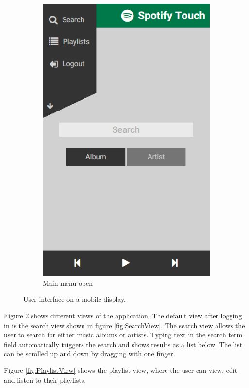 \documentclass[conference]{IEEEtran}
\begin{document}
\begin{figure}[htbp]
\begin{subfigure}{0.45\columnwidth}
        \includegraphics[width=0.9\linewidth]{spotify_menu.png}
        \caption{Main menu open}
        \label{fig:MenuView}
    \end{subfigure}
    \caption{User interface on a mobile display.}
    \label{fig:GUI}
\end{figure}

Figure \ref{fig:GUI} shows different views of the application.
The default view after logging in is the search view shown in figure \ref{fig:SearchView}.
The search view allows the user to search for either music albums or artists.
Typing text in the search term field automatically triggers the search and shows results as a list below.
The list can be scrolled up and down by dragging with one finger.

Figure \ref{fig:PlaylistView} shows the playlist view, where the user can view, edit and listen to their playlists.
\end{document}
